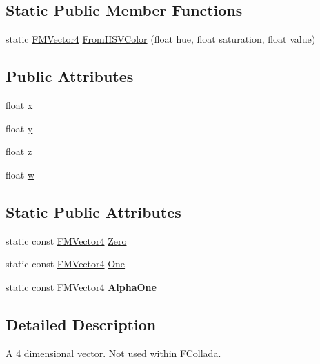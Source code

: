 \subsection*{Static Public Member Functions}
\begin{DoxyCompactItemize}
\item 
static \hyperlink{classFMVector4}{FMVector4} \hyperlink{classFMVector4_a8cca8e1217107af6a800eab4e043f8b2}{FromHSVColor} (float hue, float saturation, float value)
\end{DoxyCompactItemize}
\subsection*{Public Attributes}
\begin{DoxyCompactItemize}
\item 
float \hyperlink{classFMVector4_afe5d4e4d762d99547c6c4ba2e2f336db}{x}
\item 
float \hyperlink{classFMVector4_a36567c972039925e7ee11faa69ddd5ab}{y}
\item 
float \hyperlink{classFMVector4_aa86685f8bdb9b6ce80edd1b4424475b8}{z}
\item 
float \hyperlink{classFMVector4_a38311f6dd1139e792d6fad137572a82a}{w}
\end{DoxyCompactItemize}
\subsection*{Static Public Attributes}
\begin{DoxyCompactItemize}
\item 
static const \hyperlink{classFMVector4}{FMVector4} \hyperlink{classFMVector4_a98ad0940dc7826de03de889f947a3ef6}{Zero}
\item 
static const \hyperlink{classFMVector4}{FMVector4} \hyperlink{classFMVector4_ae76b0f45630d1c2ff5f14409c15357ac}{One}
\item 
\hypertarget{classFMVector4_a195a80f3291baf3180202b691eab4357}{
static const \hyperlink{classFMVector4}{FMVector4} {\bfseries AlphaOne}}
\label{classFMVector4_a195a80f3291baf3180202b691eab4357}

\end{DoxyCompactItemize}


\subsection{Detailed Description}
A 4 dimensional vector. Not used within \hyperlink{namespaceFCollada}{FCollada}. 

